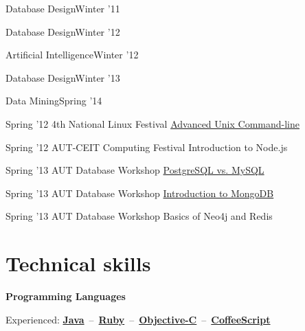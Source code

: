 \documentclass{tccv}
\begin{document}
{{\begin{ta}
\item{Database Design}{Winter '11}

\item{Database Design}{Winter '12}

\item{Artificial Intelligence}{Winter '12}

\item{Database Design}{Winter '13}

\item{Data Mining}{Spring '14}

\end{ta}



\vspace{15pt}


\begin{presenter}

\item{Spring '12}
	 {4th National Linux Festival}
	 {\href{http://bit.ly/linux2012}{Advanced Unix Command-line}}

\item{Spring '12}
	 {AUT-CEIT Computing Festival}
	 {Introduction to Node.js}


\item{Spring '13}
	 {AUT Database Workshop}
	 {\href{http://bit.ly/aut-postgresql}{PostgreSQL vs. MySQL}}

\item{Spring '13}
	 {AUT Database Workshop}
	 {\href{http://bit.ly/aut-mongodb}{Introduction to MongoDB}}

\item{Spring '13}
	 {AUT Database Workshop}
	 {Basics of Neo4j and Redis}
\end{presenter}


\vspace{-15pt}











\section{Technical skills}

\hspace{-1pt}%
\textsf{\textbf{Programming Languages}}
	 
\hspace{2pt}%
Experienced:
\mbox{\href{http://www.oracle.com/technetwork/java/}{\bf Java} -- %
     \href{https://www.ruby-lang.org/en/}{\bf Ruby} -- %
     \href{https://en.wikipedia.org/wiki/Objective-C}{\bf Objective-C} -- %
     \href{http://coffeescript.org}{\bf CoffeeScript}%
}

}}
\end{document}
